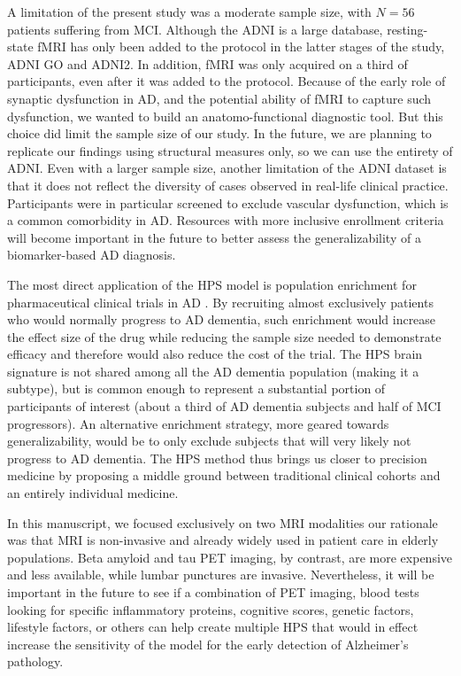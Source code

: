 \documentclass[authoryear]{elsarticle}
\begin{document}
A limitation of the present study was a moderate sample size, with $N=56$ patients suffering from MCI. Although the ADNI is a large database, resting-state fMRI has only been added to the protocol in the latter stages of the study, ADNI GO and ADNI2. In addition, fMRI was only acquired on a third of participants, even after it was added to the protocol. Because of the early role of synaptic dysfunction in AD, and the potential ability of fMRI to capture such dysfunction, we wanted to build an anatomo-functional diagnostic tool. But this choice did limit the sample size of our study. In the future, we are planning to replicate our findings using structural measures only, so we can use the entirety of ADNI. Even with a larger sample size, another limitation of the ADNI dataset is that it does not reflect the diversity of cases observed in real-life clinical practice. Participants were in particular screened to exclude vascular dysfunction, which is a common comorbidity in AD. Resources with more inclusive enrollment criteria will become important in the future to better assess the generalizability of a biomarker-based AD diagnosis.

The most direct application of the HPS model is population enrichment for pharmaceutical clinical trials in AD \citep{Woo2017,Mathotaarachchi2017}. By recruiting almost exclusively patients who would normally progress to AD dementia, such enrichment would increase the effect size of the drug while reducing the sample size needed to demonstrate efficacy and therefore would also reduce the cost of the trial. The HPS brain signature is not shared among all the AD dementia population (making it a subtype), but is common enough to represent a substantial portion of participants of interest (about a third of AD dementia subjects and half of MCI progressors). An alternative enrichment strategy, more geared towards generalizability, would be to only exclude subjects that will very likely not progress to AD dementia. The HPS method thus brings us closer to precision medicine by proposing a middle ground between traditional clinical cohorts and an entirely individual medicine.

In this manuscript, we focused exclusively on two MRI modalities our rationale was that MRI is non-invasive and already widely used in patient care in elderly populations. Beta amyloid and tau PET imaging, by contrast, are more expensive and less available, while lumbar punctures are invasive. Nevertheless, it will be important in the future to see if a combination of PET imaging, blood tests looking for specific inflammatory proteins, cognitive scores, genetic factors, lifestyle factors, or others can help create multiple HPS that would in effect increase the sensitivity of the model for the early detection of Alzheimer's pathology.
\end{document}
